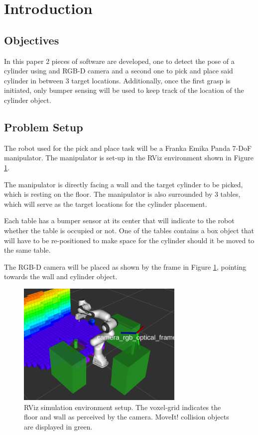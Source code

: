 \section{Introduction}\label{Sec:introduction}
\subsection*{Objectives}
In this paper 2 pieces of software are developed, one to detect the pose of a cylinder using and RGB-D camera and a second one to pick and place said cylinder in between 3 target locations. Additionally, once the first grasp is initiated, only bumper sensing will be used to keep track of the location of the cylinder object.

\subsection*{Problem Setup}
The robot used for the pick and place task will be a Franka Emika Panda 7-DoF manipulator. The manipulator is set-up in the RViz environment shown in Figure \ref{fig:setup}.

The manipulator is directly facing a wall and the target cylinder to be picked, which is resting on the floor. The manipulator is also surrounded by 3 tables, which will serve as the target locations for the cylinder placement. 

Each table has a bumper sensor at its center that will indicate to the robot whether the table is occupied or not. One of the tables contains a box object that will have to be re-positioned to make space for the cylinder should it be moved to the same table.

The RGB-D camera will be placed as shown by the frame in Figure \ref{fig:setup}, pointing towards the wall and cylinder object.

\begin{figure}[h]
    \centering
    \includegraphics[width=8cm]{Images/Setup.png}
    \caption{RViz simulation environment setup. The voxel-grid indicates the floor and wall as perceived by the camera. MoveIt! collision objects are displayed in green.}
    \label{fig:setup}
\end{figure}

